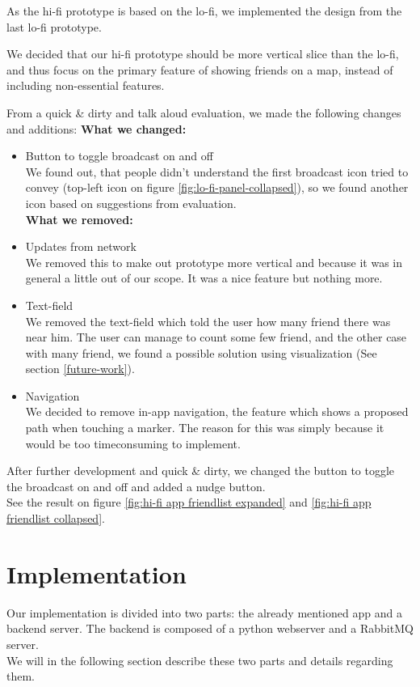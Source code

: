 \documentclass[runningheads,a4paper]{llncs}
\begin{document}
As the hi-fi prototype is based on the lo-fi, we implemented the design from the last lo-fi prototype. 

We decided that our hi-fi prototype should be more vertical slice than the lo-fi, and thus focus on the primary feature of showing friends on a map, instead of including non-essential features. 

From a quick \& dirty and talk aloud evaluation, we made the following changes and additions:
\textbf{What we changed:}\begin{itemize}
\item Button to toggle broadcast on and off\\
We found out, that people didn’t understand the first broadcast icon tried to convey (top-left icon on figure \ref{fig:lo-fi-panel-collapsed}), so we found another icon based on suggestions from evaluation. \\

\textbf{What we removed:}
\item Updates from network\\
We removed this to make out prototype more vertical and because it was in general a little out of our scope. It was a nice feature but nothing more. \\

\item Text-field\\
We removed the text-field which told the user how many friend there was near him. The user can manage to count some few friend, and the other case with many friend, we found a possible solution using visualization (See section \ref{future-work}). \\

\item Navigation\\
We decided to remove in-app navigation, the feature which shows a proposed path when touching a marker. The reason for this was simply because it would be too timeconsuming to implement.

\end{itemize}

After further development and quick \& dirty, we changed the button to toggle the broadcast on and off and added a nudge button. \\
See the result on figure \ref{fig:hi-fi app friendlist expanded} and \ref{fig:hi-fi app friendlist collapsed}. 

\section{Implementation}
Our implementation is divided into two parts: the already mentioned app and a backend server. The backend is composed of a python webserver and a RabbitMQ server\cite{rabbitmq}. \\
We will in the following section describe these two parts and details regarding them. 
\end{document}
